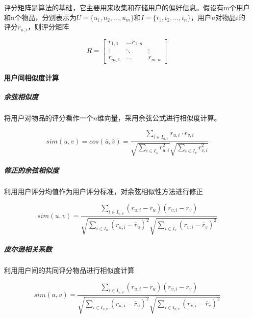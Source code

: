 \documentclass{upctrans}
\begin{document}
评分矩阵是算法的基础，它主要用来收集和存储用户的偏好信息。假设有m个用户和n个物品，分别表示为$U=\{u_1,u_2,\dots,u_m\}$和$I=\{i_1,i_2,\dots,i_n\}$，用户$u$对物品$i$的评分${r_{u,i}}$，则评分矩阵

\begin{equation*}
    R=\begin{bmatrix}
        r_{1,1} & \dots r_{1,n}\\
        \vdots & \ddots & \vdots\\
        r_{m,1} & \dots & r_{m,n}
    \end{bmatrix}
\end{equation*}

\paragraph{用户间相似度计算}
\subparagraph{余弦相似度}

将用户对物品的评分看作一个$n$维向量，采用余弦公式进行相似度计算。

\begin{equation*}
    sim(u,v)
    =cos(\overline{u},\overline{v})
    =\frac{\sum\limits_{i\in{I_{u,v}}}r_{u,i}\cdot r_{v,i}}{\sqrt{\sum\limits_{i\in{I_u}}r_{u,i}^2}\sqrt{\sum\limits_{i\in{I_v}}r_{v,i}^2}}
\end{equation*}

\subparagraph{修正的余弦相似度}

利用用户评分均值作为用户评分标准，对余弦相似性方法进行修正

\begin{equation*}
    sim(u,v)=\frac{
        \sum\limits_
        {i\in{I_{u,v}}}
        (r_{u,i}-\overline{r}_u)
        (r_{v,i}-\overline{r}_v)
    }{
        \sqrt{
            \sum\limits_
            {i\in{I_u}}
            (r_{u,i}-\overline{r}_u)^2
        }
        \sqrt{
            \sum\limits_
            {i\in{I_v}}
            (r_{v,i}-\overline{r}_v)^2
        }
    }
\end{equation*}

\subparagraph{皮尔逊相关系数}

利用用户间的共同评分物品进行相似度计算


\begin{equation*}
    sim(u,v)=\frac{
        \sum\limits_
        {i\in{I_{u,v}}}
        (r_{u,i}-\overline{r}_u)
        (r_{v,i}-\overline{r}_v)
    }{
        \sqrt{
            \sum\limits_
            {i\in{I_{u,v}}}
            (r_{u,i}-\overline{r}_u)^2
        }
        \sqrt{
            \sum\limits_
            {i\in{I_{u,v}}}
            (r_{v,i}-\overline{r}_v)^2
        }
    }
\end{equation*}
\end{document}
